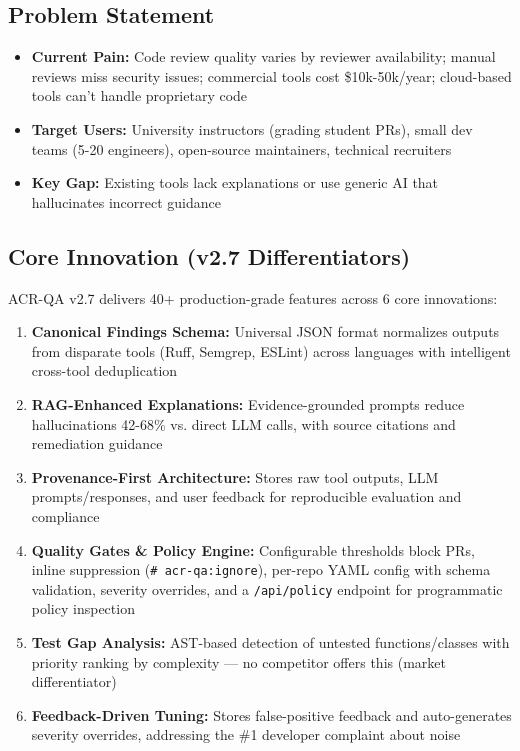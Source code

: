 \documentclass[11pt,a4paper]{article}
\begin{document}
\subsection{Problem Statement}
\begin{itemize}[leftmargin=*]
    \item \textbf{Current Pain:} Code review quality varies by reviewer availability; manual reviews miss security issues; commercial tools cost \$10k-50k/year; cloud-based tools can't handle proprietary code
    \item \textbf{Target Users:} University instructors (grading student PRs), small dev teams (5-20 engineers), open-source maintainers, technical recruiters
    \item \textbf{Key Gap:} Existing tools lack explanations or use generic AI that hallucinates incorrect guidance
\end{itemize}

\subsection{Core Innovation (v2.7 Differentiators)}

ACR-QA v2.7 delivers 40+ production-grade features across 6 core innovations:

\begin{enumerate}
    \item \textbf{Canonical Findings Schema:} Universal JSON format normalizes outputs from disparate tools (Ruff, Semgrep, ESLint) across languages with intelligent cross-tool deduplication
    \item \textbf{RAG-Enhanced Explanations:} Evidence-grounded prompts reduce hallucinations 42-68\% vs. direct LLM calls, with source citations and remediation guidance
    \item \textbf{Provenance-First Architecture:} Stores raw tool outputs, LLM prompts/responses, and user feedback for reproducible evaluation and compliance
    \item \textbf{Quality Gates \& Policy Engine:} Configurable thresholds block PRs, inline suppression (\texttt{\# acr-qa:ignore}), per-repo YAML config with schema validation, severity overrides, and a \texttt{/api/policy} endpoint for programmatic policy inspection
    \item \textbf{Test Gap Analysis:} AST-based detection of untested functions/classes with priority ranking by complexity --- no competitor offers this (market differentiator)
    \item \textbf{Feedback-Driven Tuning:} Stores false-positive feedback and auto-generates severity overrides, addressing the \#1 developer complaint about noise
\end{enumerate}
\end{document}
